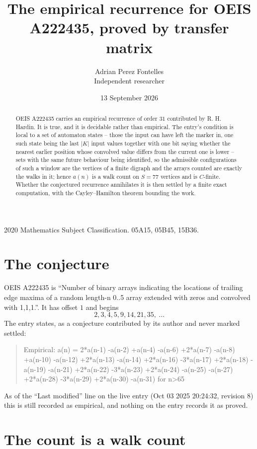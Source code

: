 \documentclass[11pt,a4paper]{article}
\title{The empirical recurrence for OEIS A222435, proved by transfer matrix}
\author{Adrian Perez Fontelles\\ \small Independent researcher}
\date{13 September 2026}
\theoremstyle{plain}
\theoremstyle{definition}
\begin{document}
\maketitle

\begin{abstract}
OEIS A222435 carries an empirical recurrence of order $31$ contributed by R. H. Hardin. It is
true, and it is decidable rather than empirical. The entry's condition is local to a set of automaton states -- those the input can have left the marker in, one such state being the last $|K|$ input values together with one bit saying whether the nearest earlier position whose convolved value differs from the current one is lower -- sets with the same future behaviour being identified, so
the admissible configurations of such a window are the vertices of a finite digraph and the
arrays counted are exactly the walks in it; hence $a(n)$ is a walk count on $S=77$ vertices
and is $C$-finite. Whether the conjectured recurrence annihilates it is then settled by a
finite exact computation, with the Cayley--Hamilton theorem bounding the work.
\end{abstract}

\noindent\small 2020 Mathematics Subject Classification. 05A15, 05B45, 15B36.\normalsize

\section{The conjecture}

OEIS A222435 is ``Number of binary arrays indicating the locations of trailing edge maxima of a random length-n 0..5 array extended with zeros and convolved with 1,1,1.''. It has offset $1$ and begins
\[
2, 3, 4, 5, 9, 14, 21, 35,\ \dots
\]
The entry states, as a conjecture contributed by its author and never marked settled:
\begin{quote}
Empirical: a(n) = 2*a(n-1) -a(n-2) +a(n-4) -a(n-6) +2*a(n-7) -a(n-8) +a(n-10) -a(n-12) +2*a(n-13) -a(n-14) +2*a(n-16) -3*a(n-17) +2*a(n-18) -a(n-19) -a(n-21) +2*a(n-22) -3*a(n-23) +2*a(n-24) -a(n-25) -a(n-27) +2*a(n-28) -3*a(n-29) +2*a(n-30) -a(n-31) for n>65
\end{quote}
As of the ``Last modified'' line on the live entry (Oct 03 2025 20:24:32, revision 8) this is still
recorded as empirical, and nothing on the entry records it as proved.

\section{The count is a walk count}
\end{document}
